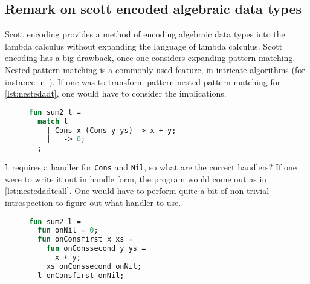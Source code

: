 \subsection{Remark on scott encoded algebraic data types}\label{sec:remscott}
Scott encoding provides a method of encoding algebraic data types into the lambda calculus without expanding the language of lambda calculus.
Scott encoding has a big drawback, once one considers expanding pattern matching.
Nested pattern matching is a commonly used feature, in intricate algorithms (for instance in~\cite{okasaki1999red}).
If one was to transform pattern nested pattern matching for \autoref{lst:nestedadt}, one would have to consider the implications.
\begin{figure}
\begin{lstlisting}[language=ML,caption={Nested pattern match},label={lst:nestedadt}]
fun sum2 l =
  match l
    | Cons x (Cons y ys) -> x + y;
    | _ -> 0;
  ;
\end{lstlisting}
\end{figure}
\texttt{l} requires a handler for \texttt{Cons} and \texttt{Nil}, so what are the correct handlers?
If one were to write it out in handle form, the program would come out as in \autoref{lst:nestedadtcall}.
One would have to perform quite a bit of non-trivial introspection to figure out what handler to use.
\begin{figure}
\begin{lstlisting}[language=ML,caption={Nested pattern match in handle form},label={lst:nestedadtcall}]
fun sum2 l =
  fun onNil = 0;
  fun onConsfirst x xs = 
    fun onConssecond y ys =
      x + y;
    xs onConssecond onNil;
  l onConsfirst onNil;
\end{lstlisting}
\end{figure}




